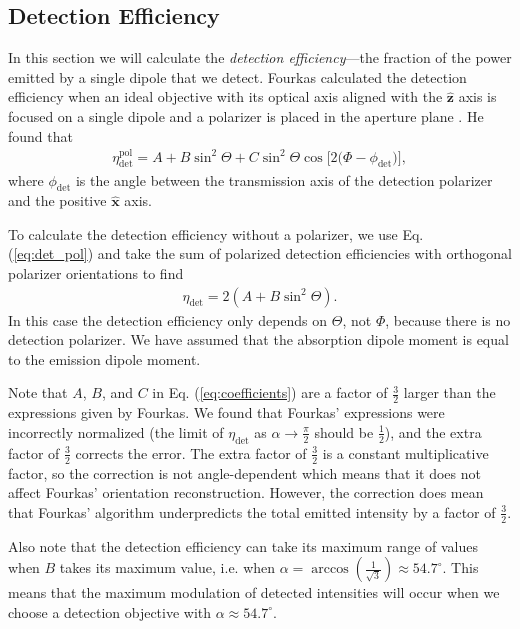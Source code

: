 \documentclass[10pt]{article}
\providecommand{\mh}[1]{\mathbf{\hat{#1}}}
\begin{document}
\subsection{Detection Efficiency}\label{detection}
In this section we will calculate the \emph{detection efficiency}---the fraction
of the power emitted by a single dipole that we detect. Fourkas calculated the
detection efficiency when an ideal objective with its optical axis aligned with
the $\mh{z}$ axis is focused on a single dipole and a polarizer is placed in
the aperture plane \cite{fourkas2001}. He found that
\begin{align}
  \eta_{\text{det}}^{\text{pol}} = A + B\sin^2\Theta + C\sin^{2}{\Theta} \cos{[2 (\Phi - \phi_{\text{det}}})], \label{eq:det_pol}
\end{align}
where $\phi_{\text{det}}$ is the angle between the transmission axis of the
detection polarizer and the positive $\mh{x}$ axis. 

To calculate the detection efficiency without a polarizer, we use {\color{urlblue}Eq.}
(\ref{eq:det_pol}) and take the sum of polarized detection efficiencies with
orthogonal polarizer orientations to find
\begin{align}
  \eta_{\text{det}} = 2(A + B\sin^2\Theta). \label{eq:scalardet}
\end{align}
In this case the detection efficiency only depends on $\Theta$, not $\Phi$,
because there is no detection polarizer. We have assumed that the absorption
dipole moment is equal to the emission dipole moment.

Note that $A$, $B$, and $C$ in {\color{urlblue}Eq.} (\ref{eq:coefficients}) are a
factor of $\frac{3}{2}$ larger than the expressions given by Fourkas. We found
that Fourkas' expressions were incorrectly normalized (the limit of
$\eta_{\text{det}}$ as $\alpha\rightarrow \frac{\pi}{2}$ should be
$\frac{1}{2}$), and the extra factor of $\frac{3}{2}$ corrects the
error. \hypertarget{normalization}{{\color{urlblue} The extra factor of
    $\frac{3}{2}$ is a constant multiplicative factor, so the}} correction
{\color{urlblue} is not angle-dependent which means that it} does not affect
Fourkas' orientation reconstruction. {\color{urlblue}However, the correction}
does mean that Fourkas' algorithm underpredicts the total emitted intensity by a
factor of $\frac{3}{2}$.

Also note that the detection efficiency can take its maximum range of values
when $B$ takes its maximum value, i.e. when
$\alpha=\arccos\left(\frac{1}{\sqrt{3}}\right) \approx 54.7^{\circ}$. This means
that the maximum modulation of detected intensities will occur when we choose a
detection objective with $\alpha \approx 54.7^{\circ}$.
\end{document}
